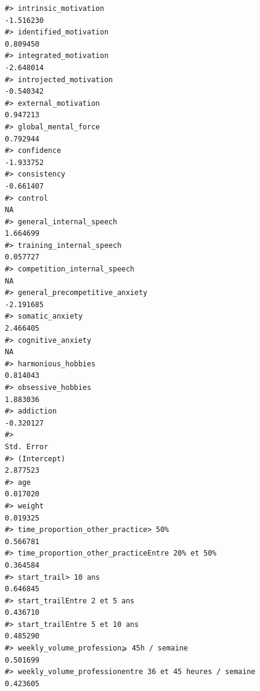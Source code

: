 \documentclass[
]{article}
\begin{document}
\begin{verbatim}
#> intrinsic_motivation                                                           -1.516230
#> identified_motivation                                                           0.809450
#> integrated_motivation                                                          -2.648014
#> introjected_motivation                                                         -0.540342
#> external_motivation                                                             0.947213
#> global_mental_force                                                             0.792944
#> confidence                                                                     -1.933752
#> consistency                                                                    -0.661407
#> control                                                                               NA
#> general_internal_speech                                                         1.664699
#> training_internal_speech                                                        0.057727
#> competition_internal_speech                                                           NA
#> general_precompetitive_anxiety                                                 -2.191685
#> somatic_anxiety                                                                 2.466405
#> cognitive_anxiety                                                                     NA
#> harmonious_hobbies                                                              0.814043
#> obsessive_hobbies                                                               1.883036
#> addiction                                                                      -0.320127
#>                                                                                Std. Error
#> (Intercept)                                                                      2.877523
#> age                                                                              0.017020
#> weight                                                                           0.019325
#> time_proportion_other_practice> 50%                                              0.566781
#> time_proportion_other_practiceEntre 20% et 50%                                   0.364584
#> start_trail> 10 ans                                                              0.646845
#> start_trailEntre 2 et 5 ans                                                      0.436710
#> start_trailEntre 5 et 10 ans                                                     0.485290
#> weekly_volume_profession⩾ 45h / semaine                                          0.501699
#> weekly_volume_professionentre 36 et 45 heures / semaine                          0.423605

\end{verbatim}
\end{document}
